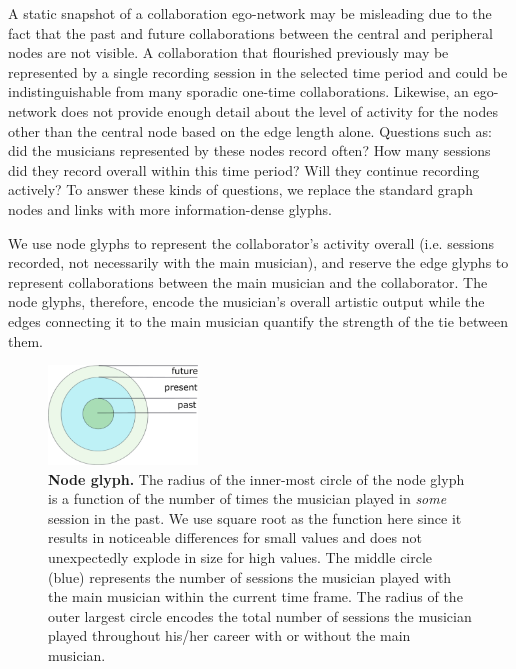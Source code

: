\documentclass[12pt]{cmuthesis}
\begin{document}
  A static snapshot of a collaboration ego-network may be misleading due to the fact
  that the past and future collaborations between the central and peripheral nodes
  are not visible. A collaboration that flourished previously may be represented
  by a single recording session in the selected time period and could be
  indistinguishable from many sporadic one-time collaborations. Likewise, an
  ego-network does not provide enough detail about the level of activity for the
  nodes other than the central node based on the edge length alone. Questions such
  as: did the musicians represented by these nodes record often? How many sessions
  did they record overall within this time period? Will they continue recording
  actively? To answer these kinds of questions, we replace the standard graph
  nodes and links with more information-dense glyphs.

  We use node glyphs to represent the collaborator's activity overall
  (i.e. sessions recorded, not necessarily with the main musician), and reserve
  the edge glyphs to represent collaborations between the main musician and the
  collaborator. The node glyphs, therefore, encode the musician's overall artistic
  output while the edges connecting it to the main musician quantify the strength
  of the tie between them.

  \begin{figure}[ht]
    \centering
    \includegraphics[height=100px]{figures/node-glyph}
    \caption{\textbf{Node glyph.} The radius of the inner-most circle of the node glyph is a function of the number of times the musician played in \emph{some} session in the past. We use square root as the function here since it results in noticeable differences for small values and does not unexpectedly explode in size for high values. The middle circle (blue) represents the number of sessions the musician played with the main musician within the current time frame. The radius of the outer largest circle encodes the total number of sessions the musician played throughout his/her career with or without the main musician.}
    \label{fig:moj:node_glyphs}
  \end{figure}
\end{document}
